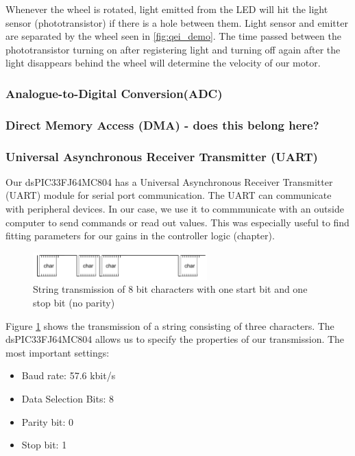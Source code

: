 Whenever the wheel is rotated, light emitted from the LED will hit the light sensor (phototransistor) if there is a hole between them. Light sensor and emitter are separated by the wheel seen in \ref{fig:qei_demo}.
The time passed between the phototransistor turning on after registering light and turning off again after the light disappears behind the wheel will determine the velocity of our motor.


\subsubsection*{Analogue-to-Digital Conversion(ADC)}

\subsubsection*{Direct Memory Access (DMA) - does this belong here?}

\subsubsection*{Universal Asynchronous Receiver Transmitter (UART)}
Our dsPIC33FJ64MC804 has a Universal Asynchronous Receiver Transmitter (UART)  module for serial port communication.
The UART can communicate with peripheral devices. 
In our case, we use it to commmunicate with an outside computer to send commands or read out values. This was especially useful to find fitting parameters for our gains in the controller logic (chapter).

\begin{figure}[htb]
    \centering
    \includegraphics[width=0.6\textwidth]{figures/software/uart_demo.png}
    \caption {String transmission of 8 bit characters with one start bit and one stop bit (no parity) \cite{alex}}
    \label{fig:uart_demo}
\end{figure}

Figure \ref{fig:uart_demo} shows the transmission of a string consisting of three characters. 
The dsPIC33FJ64MC804 allows us to specify the properties of our transmission. The most important settings:
\begin{itemize}
    \item Baud rate: 57.6 kbit/s
    \item Data Selection Bits: 8
    \item Parity bit: 0
    \item Stop bit: 1
\end{itemize}

